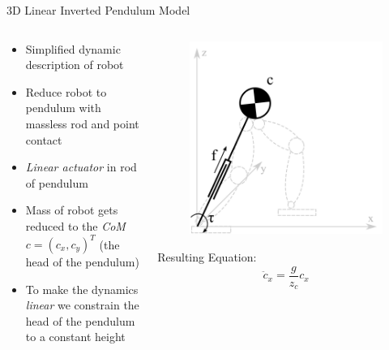 \begin{frame}{3D Linear Inverted Pendulum Model}

\begin{columns}
\begin{column}{0.55\textwidth}
\begin{itemize}
\item Simplified dynamic description of robot
\item Reduce robot to pendulum with massless rod and point contact
\item \textit{Linear actuator} in rod of pendulum
\item Mass of robot gets reduced to the \textit{CoM} $c = (c_x, c_y)^T$ (the head of the pendulum)
\item To make the dynamics \textit{linear} we constrain the head of the pendulum
to a constant height
\end{itemize}

\end{column}

\begin{column}{0.45\textwidth}
\begin{figure}
  \begin{center}
     \includegraphics[width=\textwidth]{images/3dlimp.png}
  \end{center}
\end{figure}

\vspace{-1.5em}
Resulting Equation:
\begin{equation*}
\ddot{c}_x = \frac{g}{z_c} c_x
\end{equation*}

\end{column}
\end{columns}

\end{frame}


